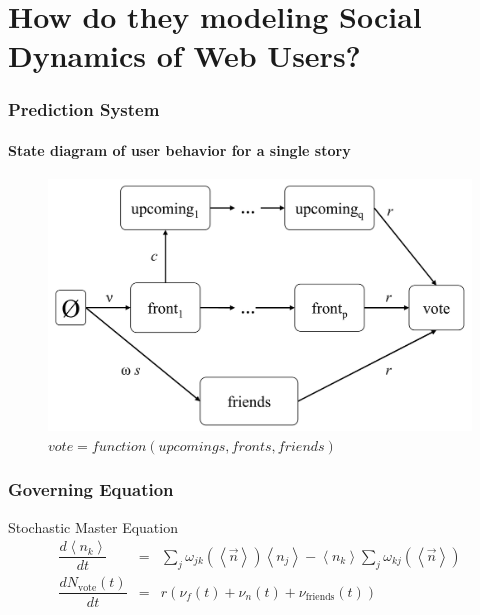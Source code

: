 \documentclass[aspectratio=43]{beamer}
\begin{document}
\section[Modeling]{How do they modeling Social Dynamics of Web Users?}
\begin{frame}
\frametitle{Prediction System}
\framesubtitle{State diagram of user behavior for a single story}
\centering
\begin{minipage}{\textwidth}
\begin{figure}
\centering
\includegraphics[height=0.7\textheight]{fig02.PNG}
\caption{$vote = function\left(upcomings, fronts, friends\right)$}
\end{figure}
\end{minipage}
\end{frame}

\begin{frame}
\frametitle{Governing Equation}
\centering
\begin{minipage}{\textwidth}
\begin{block}{Stochastic Master Equation}
\begin{equation}
\begin{array}{lcr}
\dfrac{d\left\langle n_k \right\rangle}{d t} & = & \sum\limits_{j}{\omega_{jk}{\left(\left\langle \vec{n} \right\rangle\right)}{\left\langle{}n_j{}\right\rangle}} - {\left\langle{}n_k{}\right\rangle}\sum\limits_{j}{\omega_{kj}\left(\left\langle{}\vec{n}{}\right\rangle\right)}\\
\dfrac{dN_{\mathrm{vote}}\left(t\right)}{dt} & = & r\left(\nu_f\left(t\right) + \nu_n\left(t\right) + \nu_{\mathrm{friends}}\left(t\right)\right)\\
\end{array}
\end{equation}
\end{block}
\end{minipage}
\end{frame}
\end{document}
